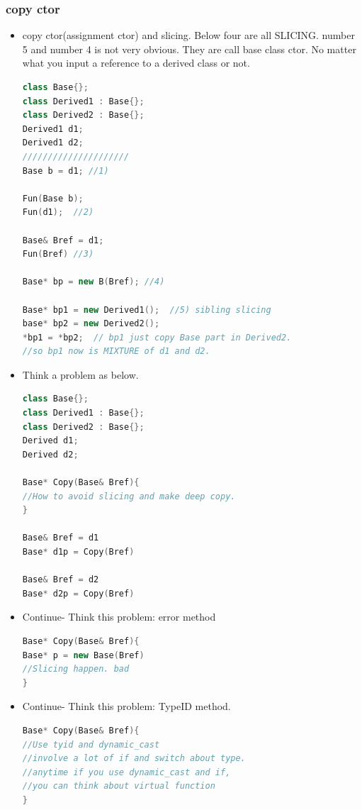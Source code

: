 \documentclass[a4paper,12pt,twoside]{book}
\begin{document}
\subsubsection{copy ctor}

\begin{itemize}

\item copy ctor(assignment ctor) and slicing. Below four are all SLICING.  number 5 and number 4 is not very obvious. They are call base class ctor.  No matter what you input a reference to a derived class or not.
\begin{lstlisting}[frame=single, language=c++]
class Base{};
class Derived1 : Base{};
class Derived2 : Base{};
Derived1 d1;
Derived1 d2;
/////////////////////
Base b = d1; //1)

Fun(Base b);
Fun(d1);  //2)

Base& Bref = d1;
Fun(Bref) //3)

Base* bp = new B(Bref); //4)

Base* bp1 = new Derived1();  //5) sibling slicing
base* bp2 = new Derived2();
*bp1 = *bp2;  // bp1 just copy Base part in Derived2.
//so bp1 now is MIXTURE of d1 and d2.
\end{lstlisting}

\item Think a problem as below.
\begin{lstlisting}[frame=single, language=c++]
class Base{};
class Derived1 : Base{};
class Derived2 : Base{};
Derived d1;
Derived d2;

Base* Copy(Base& Bref){
//How to avoid slicing and make deep copy.
}

Base& Bref = d1
Base* d1p = Copy(Bref)

Base& Bref = d2
Base* d2p = Copy(Bref)
\end{lstlisting}

\item Continue- Think this problem: error method
\begin{lstlisting}[frame=single, language=c++]
Base* Copy(Base& Bref){
Base* p = new Base(Bref)
//Slicing happen. bad
}
\end{lstlisting}
\item Continue- Think this problem: TypeID method.
\begin{lstlisting}[frame=single, language=c++]
Base* Copy(Base& Bref){
//Use tyid and dynamic_cast
//involve a lot of if and switch about type.
//anytime if you use dynamic_cast and if,
//you can think about virtual function
}
\end{lstlisting}


\end{itemize}
\end{document}

